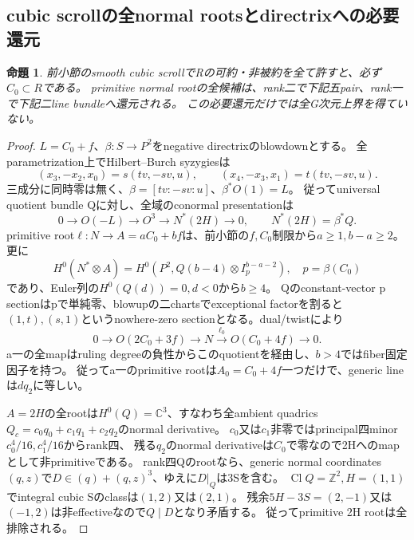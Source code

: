 \documentclass[a4paper,11pt]{ltjsarticle}
\newtheorem{proposition}{命題}[section]
\theoremstyle{definition}
\begin{document}
\subsection{cubic scrollの全normal rootsとdirectrixへの必要還元}
\begin{proposition}\label{prop:cubic-scroll-all-roots-directrix}
前小節のsmooth cubic scrollでRの可約・非被約を全て許すと、必ず$C_0\subset R$である。
primitive normal rootの全候補は、rank二で下記五pair、rank一で下記二line bundleへ還元される。
この必要還元だけでは全G次元上界を得ていない。
\end{proposition}
\begin{proof}
$L=C_0+f$、$\beta:S\to P^2$をnegative directrixのblowdownとする。
全parametrization上でHilbert--Burch syzygiesは
\[
 (x_3,-x_2,x_0)=s(tv,-sv,u),\qquad
 (x_4,-x_3,x_1)=t(tv,-sv,u).
\]
三成分に同時零は無く、$\beta=[tv:-sv:u]$、$\beta^*O(1)=L$。
従ってuniversal quotient bundle Qに対し、全域のconormal presentationは
\[
 0\to O(-L)\to O^3\to N^*(2H)\to0,\qquad N^*(2H)=\beta^*Q.
\]
primitive root$\ell:N\to A=aC_0+bf$は、前小節の$f,C_0$制限から$a\ge1,b-a\ge2$。
更に
\[
 H^0(N^*\otimes A)=H^0(P^2,Q(b-4)\otimes I_p^{b-a-2}),\quad p=\beta(C_0)
\]
であり、Euler列の$H^0(Q(d))=0,d<0$から$b\ge4$。
Qのconstant-vector p sectionはpで単純零、blowupの二chartsでexceptional factorを割ると
$(1,t),(s,1)$というnowhere-zero sectionとなる。dual/twistにより
\[
 0\to O(2C_0+3f)\to N\overset{\ell_0}\longrightarrow O(C_0+4f)\to0.
\]
a一の全mapはruling degreeの負性からこのquotientを経由し、$b>4$ではfiber固定因子を持つ。
従ってa一のprimitive rootは$A_0=C_0+4f$一つだけで、generic lineは$dq_2$に等しい。

$A=2H$の全rootは$H^0(Q)=\mathbb C^3$、すなわち全ambient quadrics$Q_c=c_0q_0+c_1q_1+c_2q_2$のnormal derivative。
$c_0$又は$c_1$非零ではprincipal四minor$c_0^4/16,c_1^4/16$からrank四、
残る$q_2$のnormal derivativeは$C_0$で零なので2Hへのmapとして非primitiveである。
rank四Qのrootなら、generic normal coordinates$(q,z)$で$D\in(q)+(q,z)^3$、ゆえに$D|_Q$は3Sを含む。
$\operatorname{Cl}Q=\mathbb Z^2,H=(1,1)$でintegral cubic Sのclassは$(1,2)$又は$(2,1)$。
残余$5H-3S=(2,-1)$又は$(-1,2)$は非effectiveなので$Q\mid D$となり矛盾する。
従ってprimitive 2H rootは全排除される。


\end{proof}
\end{document}
